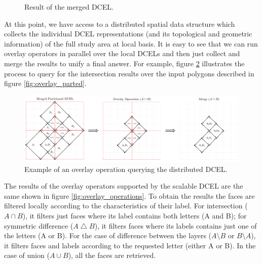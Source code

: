 \begin{figure}[!ht]
    \centering
        
    \caption{Result of the merged DCEL.}\label{fig:merged_dcel}
\end{figure}

At this point, we have access to a distributed spatial data structure which collects the individual DCEL representations (and its topological and geometric information) of the full study area at local basis.  It is easy to see that we can run overlay operators in parallel over the local DCELs and then just collect and merge the results to unify a final answer.  For example, figure \ref{fig:overlay_parted2} illustrates the process to query for the intersection results over the input polygons described in figure \ref{fig:overlay_parted}.  

\begin{figure}[!ht]
    \centering
    \includegraphics[width=\linewidth]{figures/03-OverlayParted2}
    \caption{Example of an overlay operation querying the distributed DCEL.} \label{fig:overlay_parted2}
\end{figure}

The results of the overlay operators supported by the scalable DCEL are the same shown in figure \ref{fig:overlay_operations}.  To obtain the results the faces are filtered locally according to the characteristics of their label.  For intersection ($A \cap B$), it filters just faces where its label contains both letters (A and B); for symmetric difference ($A \bigtriangleup B$), it filters faces where its labels contains just one of the letters (A or B).  For the case of difference between the layers ($A \setminus B$ or $B \setminus A$), it filters faces and labels according to the requested letter (either A or B). In the case of union ($A \cup B$), all the faces are retrieved. 

